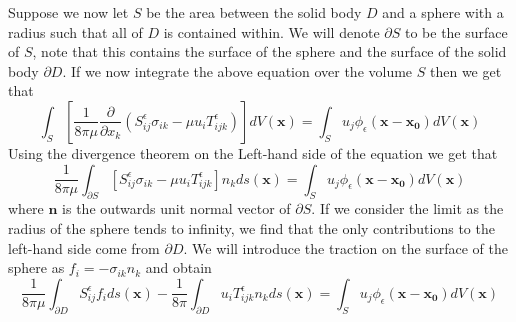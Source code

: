Suppose we now let $S$ be the area between the solid body $D$ and a sphere with a radius such that all of $D$ is contained within. We will denote $\partial S$ to be the surface of $S$, note that this contains the surface of the sphere and the surface of the solid body $\partial D$. If we now integrate the above equation over the volume $S$ then we get that
\begin{equation*}
  \int_{S} \left[\frac{1}{8\pi\mu}\frac{\partial}{\partial x_k}(S^\epsilon_{ij}\sigma_{ik} - \mu u_i T^\epsilon_{ijk})\right] dV(\mathbf{x}) = \int_{S} u_j\phi_\epsilon(\mathbf{x}-\mathbf{x_0}) dV(\mathbf{x})
\end{equation*}
Using the divergence theorem on the Left-hand side of the equation we get that
\begin{equation*}
  \frac{1}{8\pi\mu}\int_{\partial S} \left[S^\epsilon_{ij}\sigma_{ik} - \mu u_i T^\epsilon_{ijk}\right]n_k ds(\mathbf{x}) = \int_{S} u_j\phi_\epsilon(\mathbf{x}-\mathbf{x_0}) dV(\mathbf{x})
\end{equation*}
where $\mathbf{n}$ is the outwards unit normal vector of $\partial S$. If we consider the limit as the radius of the sphere tends to infinity, we find that the only contributions to the left-hand side come from $\partial D$. We will introduce the traction on the surface of the sphere as $f_i = -\sigma_{ik}n_k$ and obtain
\begin{equation}
  \label{eq:BIE3}
    \frac{1}{8\pi\mu}\int_{\partial D} S^\epsilon_{ij}f_i ds(\mathbf{x}) - \frac{1}{8\pi}\int_{\partial D} u_i T^\epsilon_{ijk}n_k ds(\mathbf{x}) = \int_{S} u_j\phi_\epsilon(\mathbf{x}-\mathbf{x_0}) dV(\mathbf{x})
\end{equation}

